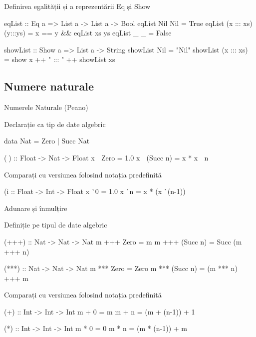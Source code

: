 \documentclass[handout,xcolor=pdftex,romanian,colorlinks]{beamer}
\begin{document}
\begin{frame}[fragile]{Definirea egalității și a reprezentării}
{Eq și Show}
\begin{asciihs}
  eqList :: Eq a => List a -> List a -> Bool
  eqList Nil Nil  = True
  eqList (x ::: xs)  (y:::ys) = x == y && eqList xs ys
  eqList _          _            = False

  showList :: Show a => List a -> String
  showList Nil = "Nil"
  showList (x ::: xs) = show x ++ " ::: " ++ showList xs 
\end{asciihs}
\end{frame}



\subsection{Numere naturale}


\begin{frame}[fragile]{Numerele Naturale (Peano)}
\begin{block}{Declarație ca tip de date algebric}
\begin{asciihs}
   data     Nat   =      Zero
                  |      Succ Nat

   (^^^) :: Float -> Nat -> Float
   x ^^^ Zero      = 1.0
   x ^^^ (Succ n) = x * x ^^^ n
\end{asciihs}
\end{block}
\begin{block}{Comparați cu versiunea folosind notația predefinită}
\begin{asciihs}
   (^^) :: Float -> Int -> Float
   x ^^ 0 = 1.0
   x ^^ n = x * (x ^^ (n-1))
\end{asciihs}
\end{block}
\end{frame}

\begin{frame}[fragile]{Adunare și înmulțire}
\begin{block}{Definiție pe tipul de date algebric}
\vspace{-2ex}
\begin{asciihs}
   (+++) :: Nat -> Nat -> Nat
   m +++ Zero     = m
   m +++ (Succ n) = Succ (m +++ n)

   (***) :: Nat -> Nat -> Nat
   m *** Zero     = Zero
   m *** (Succ n) = (m *** n) +++ m
\end{asciihs}
\end{block}
\begin{block}{Comparați cu versiunea folosind notația predefinită}
\vspace{-2ex}
\begin{asciihs}
   (+) :: Int -> Int -> Int
   m + 0 = m
   m + n = (m + (n-1)) + 1

   (*) :: Int -> Int -> Int
   m * 0 = 0
   m * n = (m * (n-1)) + m
\end{asciihs}
\end{block}
\end{frame}
\end{document}
